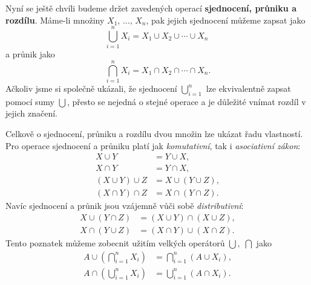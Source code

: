 Nyní se ještě chvíli budeme držet zavedených operací \textbf{sjednocení, průniku a rozdílu}. Máme-li množiny $X_1,\,\dots,\,X_n$, pak jejich sjednocení můžeme zapsat jako
\begin{equation*}
    \bigcup\limits_{i=1}^{n}{X_i}=X_1 \cup X_2 \cup \cdots \cup X_n\;
\end{equation*}
a průnik jako
\begin{equation*}
    \bigcap\limits_{i=1}^{n}{X_i}=X_1 \cap X_2 \cap \cdots \cap X_n.
\end{equation*}
Ačkoliv jsme si společně ukázali, že sjednocení $\bigcup_{i=1}^{n}$ lze ekvivalentně zapsat pomocí sumy $\bigcup$, přesto se nejedná o stejné operace a je důležité vnímat rozdíl v jejich značení.\par
Celkově o sjednocení, průniku a rozdílu dvou množin lze ukázat řadu vlastností. Pro operace sjednocení a průniku platí jak \emph{komutativní}, tak i \emph{asociativní zákon}:
\begin{align*}
    X \cup Y&=Y \cup X,\\
    X \cap Y&=Y \cap X,\\
    (X \cup Y) \cup Z &= X \cup (Y \cup Z),\\
    (X \cap Y) \cap Z &= X \cap (Y \cap Z).
\end{align*}
Navíc sjednocení a průnik jsou vzájemně vůči sobě \emph{distributivní}:
\begin{align*}
    X \cup (Y \cap Z) &= (X \cup Y) \cap (X \cup Z),\\
    X \cap (Y \cup Z) &= (X \cap Y) \cup (X \cap Z).
\end{align*}
Tento poznatek můžeme zobecnit užitím velkých operátorů $\bigcup,\;\bigcap$ jako
\begin{align*}
    A \cup \left(\bigcap\limits_{i=1}^{n}{X_i}\right)&=\bigcap\limits_{i=1}^{n}{(A \cup X_i)},\\
    A \cap \left(\bigcup\limits_{i=1}^{n}{X_i}\right)&=\bigcup\limits_{i=1}^{n}{(A \cap X_i)}.
\end{align*}